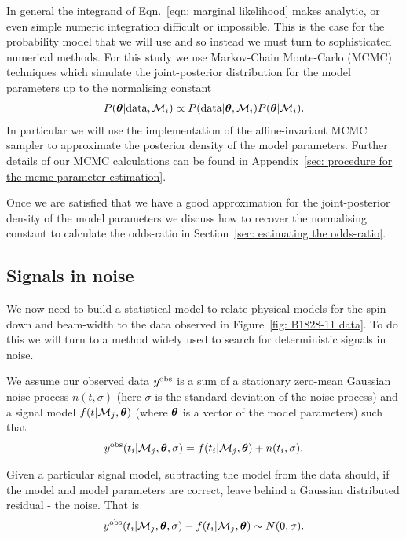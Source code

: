 \documentclass[../full_thesis/full_thesis.tex]{subfiles}
\begin{document}
In general the integrand of Eqn.~\eqref{eqn: marginal likelihood} makes
analytic, or even simple numeric integration difficult or impossible. This is
the case for the probability model that we will use and so instead we must turn
to sophisticated numerical methods.  For this study we use Markov-Chain
Monte-Carlo (MCMC) techniques which simulate the joint-posterior distribution
for the model parameters up to the normalising constant
\begin{align}
P(\boldsymbol{\theta} | \textrm{data}, \mathcal{M}_{i}) \propto
P(\textrm{data}| \boldsymbol{\theta}, \mathcal{M}_{i})P(\boldsymbol{\theta} | \mathcal{M}_{i}).
\end{align}
In particular we will use the \citet{Foreman-Mackay2013} implementation of the
affine-invariant MCMC sampler \citep{Goodman2010} to approximate the posterior
density of the model parameters.  Further details of our MCMC calculations can
be found in Appendix~\ref{sec: procedure for the mcmc parameter estimation}.

Once we are satisfied that we have a good approximation for the joint-posterior
density of the model parameters we discuss how to recover the normalising
constant to calculate the odds-ratio in Section~\ref{sec: estimating the
odds-ratio}.

\subsection{Signals in noise}
We now need to build a statistical model to relate physical models for the
spin-down and beam-width to the data observed in Figure~\ref{fig: B1828-11 data}.
To do this we will turn to a method widely used to search for deterministic
signals in noise.

We assume our observed data $y^{\textrm{obs}}$ is a sum of a stationary zero-mean
Gaussian noise process
$n(t, \sigma)$ (here $\sigma$ is the  standard deviation of the noise process)
and a signal model $f(t| \mathcal{M}_{j}, \boldsymbol{\theta})$ (where $\boldsymbol{\theta}$ is a vector of the
model parameters) such that
\begin{equation}
y^{\textrm{obs}}(t_i| \mathcal{M}_{j}, \boldsymbol{\theta}, \sigma) = f(t_i|\mathcal{M}_{j}, \boldsymbol{\theta}) + n(t_i, \sigma).
\label{eqn: yobs def}
\end{equation}

Given a particular signal model, subtracting the model from the data
should, if the model and model parameters are correct, leave behind a Gaussian
distributed residual - the noise. That is
\begin{equation}
y^{\textrm{obs}}(t_i| \mathcal{M}_{j}, \boldsymbol{\theta}, \sigma) - f(t_i|\mathcal{M}_{j}, \boldsymbol{\theta}) \sim N(0, \sigma).
\end{equation}
\end{document}
